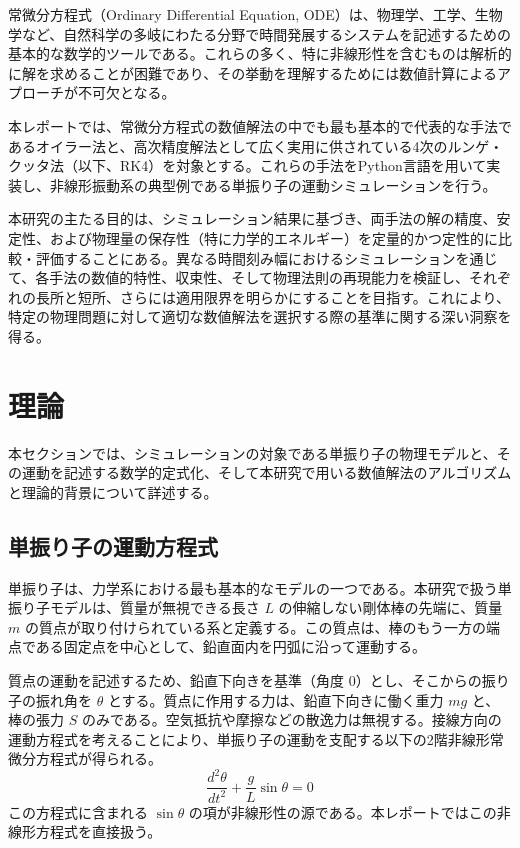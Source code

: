 \documentclass{article}
\begin{document}
常微分方程式（Ordinary Differential Equation, ODE）は、物理学、工学、生物学など、自然科学の多岐にわたる分野で時間発展するシステムを記述するための基本的な数学的ツールである。これらの多く、特に非線形性を含むものは解析的に解を求めることが困難であり、その挙動を理解するためには数値計算によるアプローチが不可欠となる。

本レポートでは、常微分方程式の数値解法の中でも最も基本的で代表的な手法であるオイラー法と、高次精度解法として広く実用に供されている4次のルンゲ・クッタ法（以下、RK4）を対象とする。これらの手法をPython言語を用いて実装し、非線形振動系の典型例である単振り子の運動シミュレーションを行う。

本研究の主たる目的は、シミュレーション結果に基づき、両手法の解の精度、安定性、および物理量の保存性（特に力学的エネルギー）を定量的かつ定性的に比較・評価することにある。異なる時間刻み幅におけるシミュレーションを通じて、各手法の数値的特性、収束性、そして物理法則の再現能力を検証し、それぞれの長所と短所、さらには適用限界を明らかにすることを目指す。これにより、特定の物理問題に対して適切な数値解法を選択する際の基準に関する深い洞察を得る。

\section{理論}

本セクションでは、シミュレーションの対象である単振り子の物理モデルと、その運動を記述する数学的定式化、そして本研究で用いる数値解法のアルゴリズムと理論的背景について詳述する。

\subsection{単振り子の運動方程式}

単振り子は、力学系における最も基本的なモデルの一つである。本研究で扱う単振り子モデルは、質量が無視できる長さ $L$ の伸縮しない剛体棒の先端に、質量 $m$ の質点が取り付けられている系と定義する。この質点は、棒のもう一方の端点である固定点を中心として、鉛直面内を円弧に沿って運動する。

質点の運動を記述するため、鉛直下向きを基準（角度 $0$）とし、そこからの振り子の振れ角を $\theta$ とする。質点に作用する力は、鉛直下向きに働く重力 $mg$ と、棒の張力 $S$ のみである。空気抵抗や摩擦などの散逸力は無視する。接線方向の運動方程式を考えることにより、単振り子の運動を支配する以下の2階非線形常微分方程式が得られる。
$$\frac{d^2\theta}{dt^2} + \frac{g}{L}\sin\theta = 0$$
この方程式に含まれる $\sin\theta$ の項が非線形性の源である。本レポートではこの非線形方程式を直接扱う。
\end{document}

